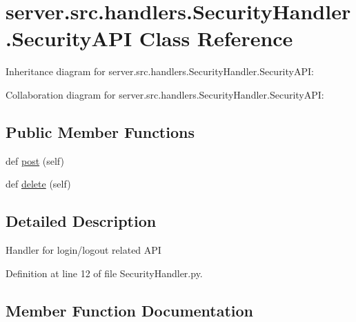 \hypertarget{classserver_1_1src_1_1handlers_1_1_security_handler_1_1_security_a_p_i}{}\section{server.\+src.\+handlers.\+Security\+Handler.\+Security\+A\+PI Class Reference}
\label{classserver_1_1src_1_1handlers_1_1_security_handler_1_1_security_a_p_i}


Inheritance diagram for server.\+src.\+handlers.\+Security\+Handler.\+Security\+A\+PI\+:


Collaboration diagram for server.\+src.\+handlers.\+Security\+Handler.\+Security\+A\+PI\+:
\subsection*{Public Member Functions}
\begin{DoxyCompactItemize}
\item 
def \hyperlink{classserver_1_1src_1_1handlers_1_1_security_handler_1_1_security_a_p_i_a0965347fc746270e8eb21901b3094865}{post} (self)
\item 
def \hyperlink{classserver_1_1src_1_1handlers_1_1_security_handler_1_1_security_a_p_i_a424be94cf0f2e8c89481004681311cbf}{delete} (self)
\end{DoxyCompactItemize}


\subsection{Detailed Description}
\begin{DoxyVerb}Handler for login/logout related API\end{DoxyVerb}
 

Definition at line 12 of file Security\+Handler.\+py.



\subsection{Member Function Documentation}
